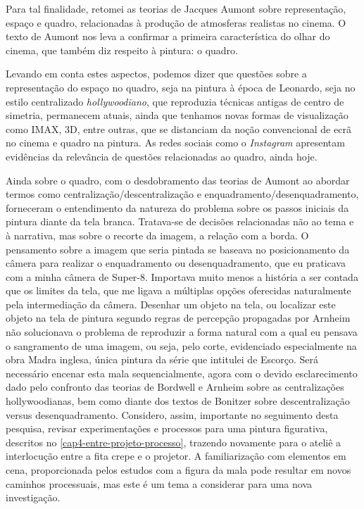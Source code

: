 Para tal finalidade, retomei as teorias de Jacques Aumont sobre
representação, espaço e quadro, relacionadas à produção de atmosferas
realistas no cinema. O texto de Aumont nos leva a confirmar a primeira
característica do olhar do cinema, que também diz respeito à pintura: o
quadro. 

Levando em conta estes aspectos, podemos dizer que questões
sobre a representação do espaço no quadro, seja na pintura à época de
Leonardo, seja no estilo centralizado \emph{hollywoodiano}, que reproduzia
técnicas antigas de centro de simetria, permanecem atuais, ainda que
tenhamos novas formas de visualização como IMAX, 3D, entre outras, que
se distanciam da noção convencional de ecrã no cinema e quadro na
pintura. As redes sociais como o \emph{Instagram} apresentam evidências da
relevância de questões relacionadas ao quadro, ainda hoje.

Ainda sobre o quadro, com o desdobramento das teorias de Aumont ao
abordar termos como centralização\slash descentralização e
enquadramento/desenquadramento, forneceram o entendimento da natureza
do problema sobre os passos iniciais da pintura diante da tela branca.
Tratava-se de decisões relacionadas não ao tema e à narrativa, mas
sobre o recorte da imagem, a relação com a borda. O pensamento sobre a
imagem que seria pintada se baseava no posicionamento da câmera para
realizar o enquadramento ou desenquadramento, que eu praticava com a
minha câmera de Super-8. Importava muito menos a história a ser contada
que os limites da tela, que me ligava a múltiplas opções oferecidas
naturalmente pela intermediação da câmera. Desenhar um objeto na tela,
ou localizar este objeto na tela de pintura segundo regras de percepção
propagadas por Arnheim não solucionava o problema de reproduzir a forma
natural com a qual eu pensava o sangramento de uma imagem, ou seja,
pelo corte, evidenciado especialmente na obra Madra inglesa, única
pintura da série que intitulei de Escorço. Será necessário encenar esta
mala sequencialmente, agora com o devido esclarecimento dado pelo
confronto das teorias de Bordwell e Arnheim sobre as centralizações
hollywoodianas, bem como diante dos textos de Bonitzer sobre
descentralização versus desenquadramento. Considero, assim, importante
no seguimento desta pesquisa, revisar experimentações e processos para
uma pintura figurativa, descritos no \cref{cap4-entre-projeto-processo}, trazendo novamente
para o ateliê a interlocução entre a fita crepe e o projetor. A
familiarização com elementos em cena, proporcionada pelos estudos com a
figura da mala pode resultar em novos caminhos processuais, mas este é
um tema a considerar para uma nova investigação.

